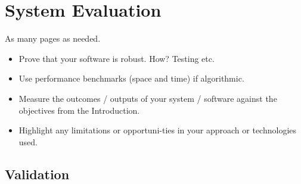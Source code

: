 \chapter{System Evaluation}
As many pages as needed.
\begin{itemize}
\item Prove that your software is robust. How? Testing etc. 
\item Use performance benchmarks (space and time) if algorithmic.
\item Measure the outcomes / outputs of your system / software against the objectives from the Introduction.
\item Highlight any limitations or opportuni-ties in your approach or technologies used.
\end{itemize}

\section{Validation}
